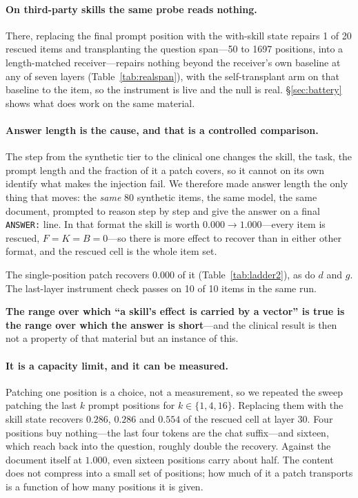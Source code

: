 \documentclass{article}
\newcommand{\dvec}{\ensuremath{d}}
\newcommand{\gvec}{\ensuremath{g}}
\begin{document}
\paragraph{On third-party skills the same probe reads nothing.} There,
replacing the final prompt position with the with-skill state repairs 1 of 20
rescued items and transplanting the question span---50 to 1697 positions, into a
length-matched receiver---repairs nothing beyond the receiver's own baseline at
any of seven layers (Table~\ref{tab:realspan}), with the self-transplant arm on
that baseline to the item, so the instrument is live and the null is real.
\S\ref{sec:battery} shows what does work on the same material.

\paragraph{Answer length is the cause, and that is a controlled comparison.}
The step from the synthetic tier to the clinical one changes the skill, the
task, the prompt length and the fraction of it a patch covers, so it cannot on
its own identify what makes the injection fail. We therefore made answer length
the only thing that moves: the \emph{same} 80 synthetic items, the same model,
the same document, prompted to reason step by step and give the answer on a
final \texttt{ANSWER:} line. In that format the skill is worth $0.000 \to
1.000$---every item is rescued, $F=K=B=0$---so there is more effect to recover
than in either other format, and the rescued cell is the whole item set.

The single-position patch recovers $\mathbf{0.000}$ of it
(Table~\ref{tab:ladder2}), as do $\dvec$ and $\gvec$. The last-layer
instrument check passes on 10 of 10 items in the same run.





\textbf{The range over which ``a skill's effect is carried by a vector'' is true
is the range over which the answer is short}---and the clinical result is then
not a property of that material but an instance of this.

\paragraph{It is a capacity limit, and it can be measured.} Patching one
position is a choice, not a measurement, so we repeated the sweep patching the
last $k$ prompt positions for $k \in \{1,4,16\}$. Replacing them with the skill
state recovers $0.286$, $0.286$ and $\mathbf{0.554}$ of the rescued cell at
layer 30. Four positions buy nothing---the last four tokens are the chat
suffix---and sixteen, which reach back into the question, roughly double the
recovery. Against the document itself at $1.000$, even sixteen positions carry
about half. The content does not compress into a small set of positions; how
much of it a patch transports is a function of how many positions it is given.
\end{document}
